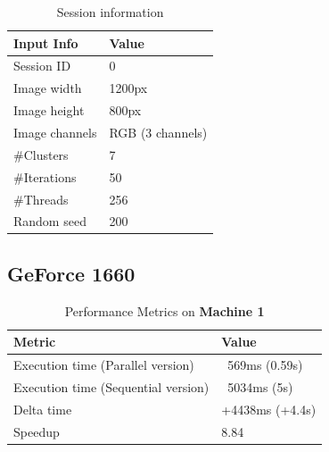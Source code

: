 \begin{table}[H]
    \centering
    \begin{tabular}{|l|l|}
    \hline
    \textbf{Input Info} & \textbf{Value} \\ \hline
    Session ID          & 0              \\ \hline
    Image width         & 1200px         \\ \hline
    Image height        & 800px          \\ \hline
    Image channels      & RGB (3 channels) \\ \hline
    \#Clusters          & 7              \\ \hline
    \#Iterations        & 50             \\ \hline
    \#Threads           & 256            \\ \hline
    Random seed         & 200            \\ \hline
    \end{tabular}
    \caption{Session information}
    \label{table:session_information_test1}
    \end{table}
    
\subsection{GeForce 1660}

    \begin{table}[H]
        \centering
        \begin{tabular}{|l|l|}
        \hline
        \textbf{Metric}                     & \textbf{Value}                \\ \hline
        Execution time (Parallel version)   & ~569ms (0.59s)                \\ \hline
        Execution time (Sequential version) & ~5034ms (5s)                  \\ \hline
        Delta time                          & +4438ms (+4.4s)               \\ \hline
        Speedup                             & 8.84                          \\ \hline
        \end{tabular}
        \caption{Performance Metrics on \textbf{Machine 1}}
        \label{table:performance_metrics_test1_machine1}
        \end{table}
        

